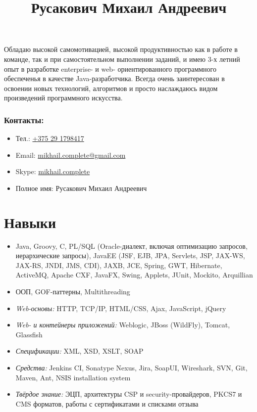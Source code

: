 \documentclass[a4paper, 12pt]{article}
\title{Русакович Михаил Андреевич}
\author{}
\date{}
\newcommand{\itemlabel}[1]{
    \textit{#1:}}
\begin{document}
\maketitle

Обладаю высокой самомотивацией, высокой продуктивностью как в работе в команде, так и при самостоятельном выполнении заданий, и имею 3-х летний опыт в разработке enterprise- и web- ориентированного программного обеспеченья в качестве Java-разработчика.\newline
Всегда очень заинтересован в освоении новых технологий, алгоритмов и просто наслаждаюсь видом произведений программного искусства. 

\subsubsection*{Контакты:}
\begin{itemize}
    \item Тел.: \href{tel:+375291798417}{+375 29 1798417}
    \item Email: \href{mailto:mikhail.complete@gmail.com}{mikhail.complete@gmail.com}
    \item Skype: \href{callto:mikhail.complete}{mikhail.complete}
    \item Полное имя: Русакович Михаил Андреевич
\end{itemize}


\section*{Навыки}

    \begin{itemize}
        \item Java, Groovy, C, PL/SQL (Oracle-диалект, включая оптимизацию запросов, иерархические запросы), JavaEE (JSF, EJB, JPA, Servlets, JSP, JAX-WS, JAX-RS, JNDI, JMS, CDI), JAXB, JCE, Spring, GWT, Hibernate, ActiveMQ, Apache CXF, JavaFX, Swing, Applets, JUnit, Mockito, Arquillian
        \item ООП, GOF-паттерны, Multithreading
        \item \itemlabel{Web-основы} HTTP, TCP/IP, HTML/CSS, Ajax, JavaScript, jQuery
        \item \itemlabel{Web- и контейнеры приложений} Weblogic, JBoss (WildFly), Tomcat, Glassfish
        \item \itemlabel{Спецификации} XML, XSD, XSLT, SOAP
        \item \itemlabel{Средства} Jenkins CI, Sonatype Nexus, Jira, SoapUI, Wireshark, SVN, Git, Maven, Ant, NSIS installation system
        \item \itemlabel{Твёрдое знание} ЭЦП, архитектуры CSP и security-провайдеров, PKCS7 и CMS форматов, работы с сертификатами и списками отзыва
    \end{itemize}
\end{document}
